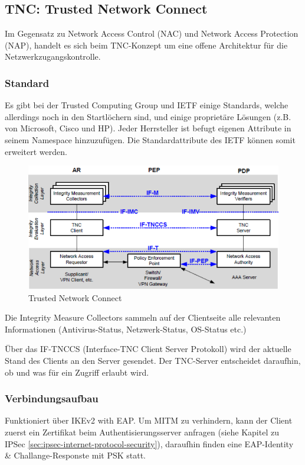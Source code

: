 \clearpage

\subsection{TNC: Trusted Network Connect}
Im Gegensatz zu Network Access Control (NAC) und Network Access Protection (NAP), handelt es sich beim TNC-Konzept um eine offene Architektur für die Netzwerkzugangskontrolle. 
\subsubsection{Standard}
Es gibt bei der Trusted Computing Group und IETF einige Standards, welche allerdings noch in den Startlöchern sind, und einige proprietäre Lösungen (z.B. von Microsoft, Cisco und HP). Jeder Herrsteller ist befugt eigenen Attribute in seinem Namespace hinzuzufügen. Die Standardattribute des IETF können somit erweitert werden.


\begin{figure}[h!]
	\centering
	\includegraphics[width=0.7\linewidth]{images/nac_trusted_network_connect}
	\caption{Trusted Network Connect}
	\label{fig:nactrustednetworkconnect}
\end{figure}

Die Integrity Measure Collectors sammeln auf der Clientseite alle relevanten Informationen (Antivirus-Status, Netzwerk-Status, OS-Status etc.)

Über das IF-TNCCS (Interface-TNC Client Server Protokoll) wird der aktuelle Stand des Clients an den Server gesendet. Der TNC-Server entscheidet daraufhin, ob und was für ein Zugriff erlaubt wird.

\subsubsection{Verbindungsaufbau}

Funktioniert über IKEv2 with EAP. Um MITM zu verhindern, kann der Client zuerst ein Zertifikat beim Authentisierungsserver anfragen (siehe Kapitel zu IPSec \ref{sec:ipsec-internet-protocol-security}), daraufhin finden eine EAP-Identity \& Challange-Responste mit PSK statt.

